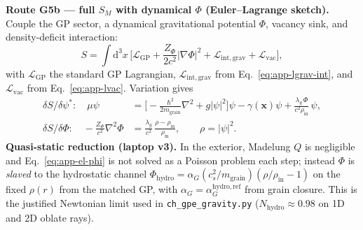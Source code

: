 \documentclass[11pt,a4paper]{article}
\begin{document}
\textbf{Route G5b --- full $S_M$ with dynamical $\Phi$ (Euler--Lagrange sketch).}
Couple the GP sector, a dynamical gravitational potential $\Phi$, vacancy sink, and density-deficit interaction:
\begin{equation}
  S = \int \mathrm{d}^3 x\,
  \Big[
    \mathcal{L}_{\mathrm{GP}}
    + \frac{Z_\Phi}{2c^2}|\nabla\Phi|^2
    + \mathcal{L}_{\mathrm{int,grav}}
    + \mathcal{L}_{\mathrm{vac}}
  \Big],
  \label{eq:app-sm-action}
\end{equation}
with $\mathcal{L}_{\mathrm{GP}}$ the standard GP Lagrangian, $\mathcal{L}_{\mathrm{int,grav}}$ from Eq.~\ref{eq:app-lgrav-int}, and $\mathcal{L}_{\mathrm{vac}}$ from Eq.~\ref{eq:app-lvac}.
Variation gives
\begin{align}
  \delta S/\delta\psi^*:\quad
  \mu\psi &= \Big[-\frac{\hbar^2}{2m_{\mathrm{grain}}}\nabla^2 + g|\psi|^2\Big]\psi
  - \gamma(\mathbf{x})\psi
  + \frac{\lambda_g\,\Phi}{c^2\rho_{\mathrm{in}}}\,\psi,
  \label{eq:app-el-psi}\\
  \delta S/\delta\Phi:\quad
  -\frac{Z_\Phi}{c^2}\nabla^2\Phi &= \frac{\lambda_g}{c^2}\,\frac{\rho - \rho_{\mathrm{in}}}{\rho_{\mathrm{in}}},
  \qquad \rho = |\psi|^2.
  \label{eq:app-el-phi}
\end{align}
\textbf{Quasi-static reduction (laptop v3).}
In the exterior, Madelung $Q$ is negligible and Eq.~\ref{eq:app-el-phi} is not solved as a Poisson problem each step; instead $\Phi$ is \emph{slaved} to the hydrostatic channel $\Phi_{\mathrm{hydro}} = \alpha_G (c_s^2/m_{\mathrm{grain}})(\rho/\rho_{\mathrm{in}}-1)$ on the fixed $\rho(r)$ from the matched GP, with $\alpha_G = \alpha_G^{\mathrm{hydro,ref}}$ from grain closure.
This is the justified Newtonian limit used in \texttt{ch\_gpe\_gravity.py} ($N_{\mathrm{hydro}} \approx 0.98$ on 1D and 2D oblate rays).
\end{document}
